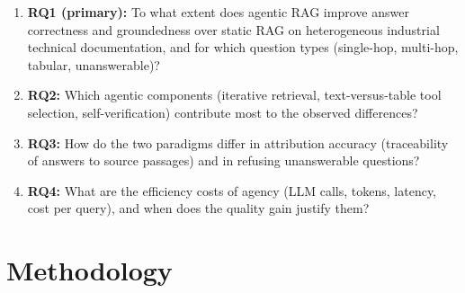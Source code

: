 \documentclass[10pt,a4paper]{article}
\begin{document}
\begin{enumerate}
    \item \textbf{RQ1 (primary):} To what extent does agentic RAG improve answer correctness and groundedness over static RAG on heterogeneous industrial technical documentation, and for which question types (single-hop, multi-hop, tabular, unanswerable)?
    \item \textbf{RQ2:} Which agentic components (iterative retrieval, text-versus-table tool selection, self-verification) contribute most to the observed differences?
    \item \textbf{RQ3:} How do the two paradigms differ in attribution accuracy (traceability of answers to source passages) and in refusing unanswerable questions?
    \item \textbf{RQ4:} What are the efficiency costs of agency (LLM calls, tokens, latency, cost per query), and when does the quality gain justify them?
\end{enumerate}

\section{Methodology}
\end{document}
